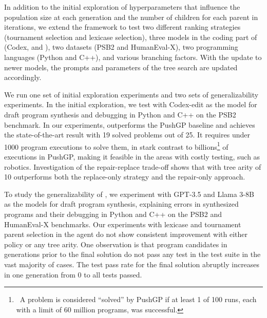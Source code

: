 In addition to the initial exploration of hyperparameters that influence the population size at each generation and the number of children for each parent in \method{} iterations, we extend the framework to test two different ranking strategies (tournament selection and lexicase selection), three models in the coding part of \method{} (Codex, \gpt{} and \llama{}), two datasets (PSB2 and HumanEval-X), two programming languages (Python and C++), and various branching factors. 
With the update to newer models, the prompts and parameters of the tree search are updated accordingly. 

We run one set of initial exploration experiments and two sets of generalizability experiments. 
In the initial exploration, we test \method{} with Codex-edit as the model for draft program synthesis and debugging in Python and C++ on the PSB2 benchmark. 
In our experiments, \method{} outperforms the PushGP baseline and achieves the state-of-the-art result with 19 solved problems out of 25. 
It requires under 1000 program executions to solve them, in stark contrast to billions\footnote{~A problem is considered ``solved'' by PushGP if at least 1 of 100 runs, each with a limit of 60 million programs, was successful.} of executions in PushGP, making it feasible in the areas with costly testing, such as robotics.
Investigation of the repair-replace trade-off shows that \method{} with tree arity of 10 outperforms both the replace-only strategy and the repair-only approach. 

To study the generalizability of \method{}, we experiment with GPT-3.5 and Llama 3-8B as the models for draft program synthesis, explaining errors in synthesized programs and their debugging in Python and C++ on the PSB2 and HumanEval-X benchmarks. 
Our experiments with lexicase and tournament parent selection in the \rank{} agent do not show consistent improvement with either policy or any tree arity. 
One observation is that program candidates in generations prior to the final solution do not pass any test in the test suite in the vast majority of cases. 
The test pass rate for the final solution abruptly increases in one generation from 0 to all tests passed. 

